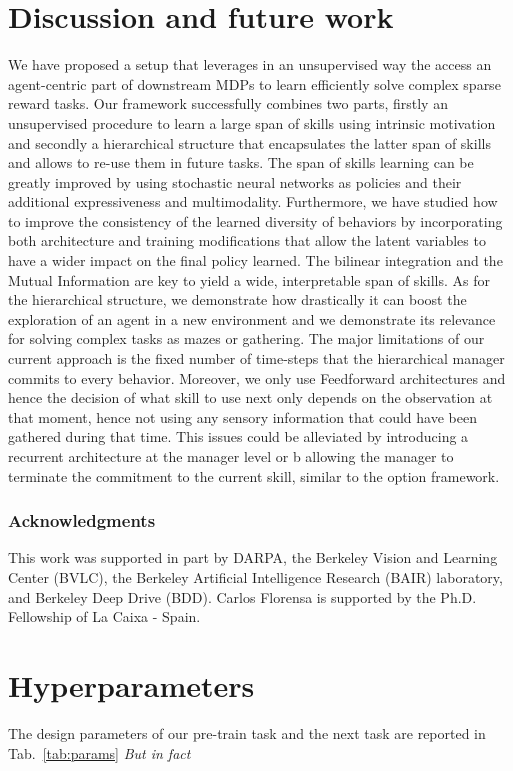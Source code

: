 \documentclass{article} %
\begin{document}
\section{Discussion and future work}
We have proposed a setup that leverages in an unsupervised way the access an agent-centric part of downstream MDPs to learn efficiently solve complex sparse reward tasks. Our framework successfully combines two parts, firstly an unsupervised procedure to learn a large span of skills using intrinsic motivation and secondly a hierarchical structure that encapsulates the latter span of skills and allows to re-use them in future tasks. The span of skills learning can be greatly improved by using stochastic neural networks as policies and their additional expressiveness and multimodality. Furthermore, we have studied how to improve the consistency of the learned diversity of behaviors by incorporating both architecture and training modifications that allow the latent variables to have a wider impact on the final policy learned. The bilinear integration and the Mutual Information are key to yield a wide, interpretable span of skills. As for the hierarchical structure, we demonstrate how drastically it can boost the exploration of an agent in a new environment and we demonstrate its relevance for solving complex tasks as mazes or gathering. The major limitations of our current approach is the fixed number of time-steps that the hierarchical manager commits to every behavior. Moreover, we only use Feedforward architectures and hence the decision of what skill to use next only depends on the observation at that moment, hence not using any sensory information that could have been gathered during that time. This issues could be alleviated by introducing a recurrent architecture at the manager level or b allowing the manager to terminate the commitment to the current skill, similar to the option framework.

\subsubsection*{Acknowledgments}
This work was supported in part by DARPA, the Berkeley Vision and Learning Center (BVLC), the Berkeley Artificial Intelligence Research (BAIR) laboratory, and Berkeley Deep Drive (BDD). Carlos Florensa is supported by the Ph.D. Fellowship of La Caixa - Spain.




\appendix
\section{Hyperparameters}
The design parameters of our pre-train task and the next task are reported in Tab.\ \ref{tab:params} \textit{But in fact}
\end{document}
